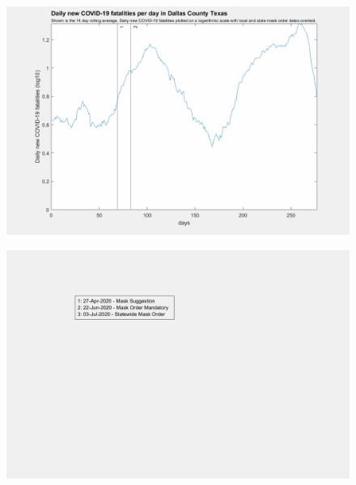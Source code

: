 \documentclass[]{article}
\begin{document}
\begin{figure}[!h]
	\includegraphics[width=\linewidth]{images/dallas_mask_order_fatalities_log.png}
	\caption{}
	\label{fig:images/dallas_mask_order_fatalities_logLabel}
\end{figure}

\begin{figure}[!h]
	\includegraphics[width=\linewidth]{legends/harris_mask_order_legend.png}
	\caption{}
	\label{fig:legends/harris_mask_order_legendLabel}
\end{figure}
\end{document}
